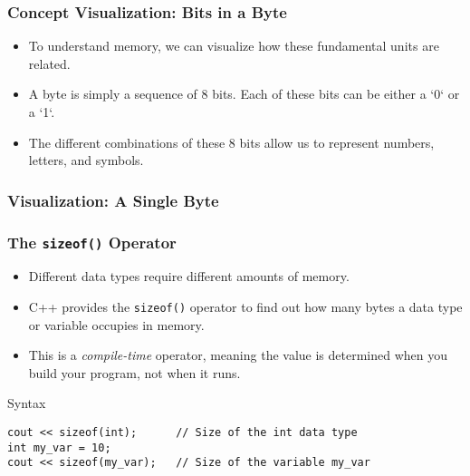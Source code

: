 \documentclass{beamer}
\begin{document}
\begin{frame}
\frametitle{Concept Visualization: Bits in a Byte}
\begin{itemize}
    \item To understand memory, we can visualize how these fundamental units are related.
    \item A byte is simply a sequence of 8 bits. Each of these bits can be either a `0` or a `1`.
    \item The different combinations of these 8 bits allow us to represent numbers, letters, and symbols.
\end{itemize}
\end{frame}

\begin{frame}
\frametitle{Visualization: A Single Byte}
\centering
{}
\end{frame}

\begin{frame}[fragile]
\frametitle{The \texttt{sizeof()} Operator}
\begin{itemize}
    \item Different data types require different amounts of memory.
    \item C++ provides the \texttt{sizeof()} operator to find out how many \alert{bytes} a data type or variable occupies in memory.
    \item This is a \textit{compile-time} operator, meaning the value is determined when you build your program, not when it runs.
\end{itemize}

\begin{block}{Syntax}
\begin{verbatim}
cout << sizeof(int);      // Size of the int data type
int my_var = 10;
cout << sizeof(my_var);   // Size of the variable my_var
\end{verbatim}
\end{block}
\end{frame}
\end{document}
